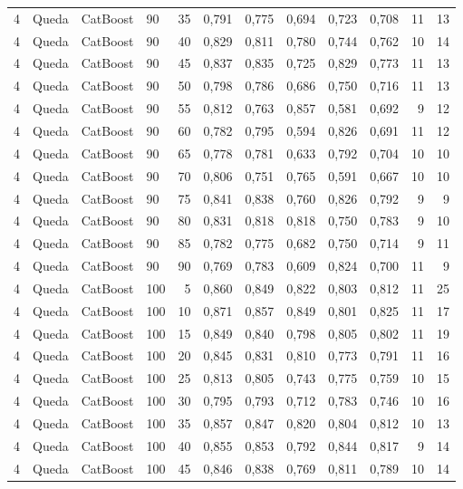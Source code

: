 \begin{longtable}{ccclrrrrrrrr}
4 & Queda & CatBoost & 90 & 35 & 0,791 & 0,775 & 0,694 & 0,723 & 0,708 & 11 & 13 \\
4 & Queda & CatBoost & 90 & 40 & 0,829 & 0,811 & 0,780 & 0,744 & 0,762 & 10 & 14 \\
4 & Queda & CatBoost & 90 & 45 & 0,837 & 0,835 & 0,725 & 0,829 & 0,773 & 11 & 13 \\
4 & Queda & CatBoost & 90 & 50 & 0,798 & 0,786 & 0,686 & 0,750 & 0,716 & 11 & 13 \\
4 & Queda & CatBoost & 90 & 55 & 0,812 & 0,763 & 0,857 & 0,581 & 0,692 & 9 & 12 \\
4 & Queda & CatBoost & 90 & 60 & 0,782 & 0,795 & 0,594 & 0,826 & 0,691 & 11 & 12 \\
4 & Queda & CatBoost & 90 & 65 & 0,778 & 0,781 & 0,633 & 0,792 & 0,704 & 10 & 10 \\
4 & Queda & CatBoost & 90 & 70 & 0,806 & 0,751 & 0,765 & 0,591 & 0,667 & 10 & 10 \\
4 & Queda & CatBoost & 90 & 75 & 0,841 & 0,838 & 0,760 & 0,826 & 0,792 & 9 & 9 \\
4 & Queda & CatBoost & 90 & 80 & 0,831 & 0,818 & 0,818 & 0,750 & 0,783 & 9 & 10 \\
4 & Queda & CatBoost & 90 & 85 & 0,782 & 0,775 & 0,682 & 0,750 & 0,714 & 9 & 11 \\
4 & Queda & CatBoost & 90 & 90 & 0,769 & 0,783 & 0,609 & 0,824 & 0,700 & 11 & 9 \\
4 & Queda & CatBoost & 100 & 5 & 0,860 & 0,849 & 0,822 & 0,803 & 0,812 & 11 & 25 \\
4 & Queda & CatBoost & 100 & 10 & 0,871 & 0,857 & 0,849 & 0,801 & 0,825 & 11 & 17 \\
4 & Queda & CatBoost & 100 & 15 & 0,849 & 0,840 & 0,798 & 0,805 & 0,802 & 11 & 19 \\
4 & Queda & CatBoost & 100 & 20 & 0,845 & 0,831 & 0,810 & 0,773 & 0,791 & 11 & 16 \\
4 & Queda & CatBoost & 100 & 25 & 0,813 & 0,805 & 0,743 & 0,775 & 0,759 & 10 & 15 \\
4 & Queda & CatBoost & 100 & 30 & 0,795 & 0,793 & 0,712 & 0,783 & 0,746 & 10 & 16 \\
4 & Queda & CatBoost & 100 & 35 & 0,857 & 0,847 & 0,820 & 0,804 & 0,812 & 10 & 13 \\
4 & Queda & CatBoost & 100 & 40 & 0,855 & 0,853 & 0,792 & 0,844 & 0,817 & 9 & 14 \\
4 & Queda & CatBoost & 100 & 45 & 0,846 & 0,838 & 0,769 & 0,811 & 0,789 & 10 & 14 \\

\end{longtable}
